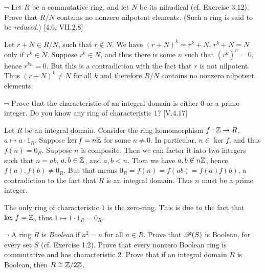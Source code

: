 \begin{problem}
	$\neg$ Let $R$ be a commutative ring, and let $N$ be its nilradical (cf. Exercise 3.12). Prove that $R/N$ contains no nonzero nilpotent elements. (Such a ring is said to be \emph{reduced}.) [4.6, VII.2.8]
\end{problem}

\begin{solution}
	Let $r + N \in R/N$, such that $r \not\in N$. We have $(r + N)^k = r^k + N$. $r^k + N = N$ only if $r^k \in N$. Suppose $r^k \in N$, and thus there is some $n$ such that $(r^k)^n = 0$, hence $r^{kn} = 0$. But this is a contradiction with the fact that $r$ is not nilpotent. Thus $(r + N)^k \neq N$ for all $k$ and therefore $R/N$ contains no nonzero nilpotent elements.
\end{solution}

\begin{problem}
	$\neg$ Prove that the characteristic of an integral domain is either $0$ or a prime integer. Do you know any ring of characteristic $1$? [V.4.17]
\end{problem}

\begin{solution}
	Let $R$ be an integral domain. Consider the ring homomorphism $f: \mathbb{Z} \to R$, $a \mapsto a \cdot 1_R$. Suppose $\ker f = n\mathbb{Z}$ for some $n \neq 0$. In particular, $n \in \ker f$, and thus $f(n) = 0_R$. Suppose $n$ is composite. Then we can factor it into two integers such that $n = ab$, $a, b \in \mathbb{Z}$, and $a, b < n$. Then we have $a, b \not \in n\mathbb{Z}$, hence $f(a), f(b) \neq 0_R$. But that means $0_R = f(n) = f(ab) = f(a)f(b)$, a contradiction to the fact that $R$ is an integral domain. Thus $n$ must be a prime integer.
	
	The only ring of characteristic $1$ is the zero-ring. This is due to the fact that $\ker f = \mathbb{Z}$, thus $1 \mapsto 1 \cdot 1_R = 0_R$.
\end{solution}

\begin{problem}
	$\neg$ A ring $R$ is \emph{Boolean} if $a^2 = a$ for all $a \in R$. Prove that $\mathscr{P}(S)$ is Boolean, for every set $S$ (cf. Exercise 1.2). Prove that every nonzero Boolean ring is commutative and has characteristic $2$. Prove that if an integral domain $R$ is Boolean, then $R \cong \mathbb{Z}/2\mathbb{Z}$.
\end{problem}

